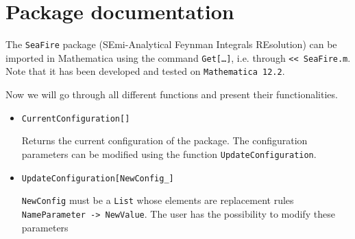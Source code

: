 \section{Package documentation}
\label{app:packagedoc}


The \texttt{SeaFire} package (SEmi-Analytical Feynman Integrals REsolution) can be imported in Mathematica using the command \texttt{Get[\dots]}, i.e. through \texttt{<< SeaFire.m}. Note that it has been developed and tested on \texttt{Mathematica 12.2}. 

Now we will go through all different functions and present their functionalities. 
\begin{itemize}
    \item \texttt{CurrentConfiguration[]}
    
    Returns the current configuration of the package. The configuration parameters can be modified using the function \texttt{UpdateConfiguration}.
    
    \item \texttt{UpdateConfiguration[NewConfig\_]}
    
    \texttt{NewConfig} must be a \texttt{List} whose elements are replacement rules \texttt{NameParameter -> NewValue}. The user has the possibility to modify these parameters
    

\end{itemize}
